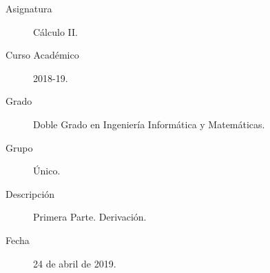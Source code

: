\documentclass[12pt]{article}
\begin{document}

    
    

    \begin{description}
        \item[Asignatura] Cálculo II.
        \item[Curso Académico] 2018-19.
        \item[Grado] Doble Grado en Ingeniería Informática y Matemáticas.
        \item[Grupo] Único.
        \item[Descripción] Primera Parte. Derivación.
        \item[Fecha] 24 de abril de 2019.
    
    \end{description}
    \newpage
    
\end{document}
